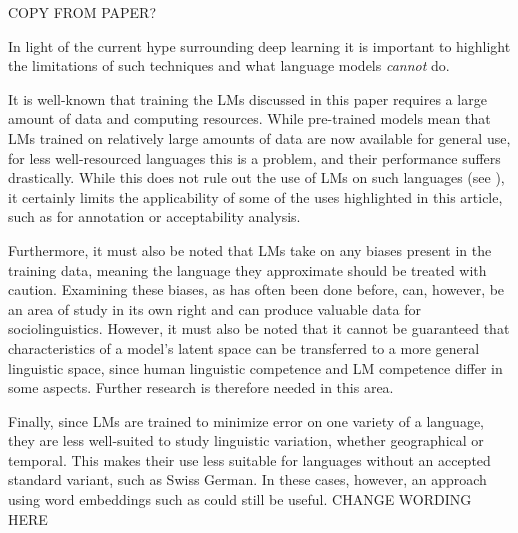 COPY FROM PAPER?

In light of the current hype surrounding deep learning it is important to highlight the limitations of such techniques and what language models \emph{cannot} do. 

It is well-known that training the LMs discussed in this paper requires a large amount of data and computing resources. While pre-trained models mean that LMs trained on relatively large amounts of data are now available for general use, for less well-resourced languages this is a problem, and their performance suffers drastically. While this does not rule out the use of LMs on such languages (see \citep{kholodna2024llms}), it certainly limits the applicability of some of the uses highlighted in this article, such as for annotation or acceptability analysis.

Furthermore, it must also be noted that LMs take on any biases present in the training data, meaning the language they approximate should be treated with caution. Examining these biases, as has often been done before, can, however, be an area of study in its own right and can produce valuable data for sociolinguistics. However, it must also be noted that it cannot be guaranteed that characteristics of a model's latent space can be transferred to a more general linguistic space, since human linguistic competence and LM competence differ in some aspects. Further research is therefore needed in this area.

Finally, since LMs are trained to minimize error on one variety of a language, they are less well-suited to study linguistic variation, whether geographical or temporal. This makes their use less suitable for languages without an accepted standard variant, such as Swiss German. In these cases, however, an approach using word embeddings such as \citet{hamilton-etal-2016-diachronic} could still be useful. CHANGE WORDING HERE

